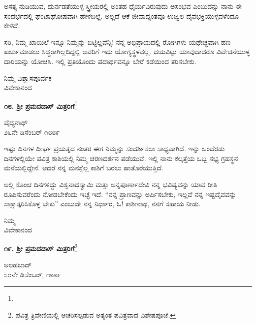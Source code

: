 ಅಸತ್ಯ ನುಡಿಯುವ, ದುರ್ನಡತೆಯುಳ್ಳ ಸ್ತ್ರೀಯರಲ್ಲಿ ಅಂತಹ ಧೈರ್ಯವಿರುವುದು ಅಸಂಭವ ಎಂಬುದನ್ನು ನಾನು ಈ ಸಂದರ್ಭದಲ್ಲಿ ಘಂಟಾಘೋಷವಾಗಿ ಹೇಳಬಲ್ಲೆ. ಅಲ್ಲದೆ ಆಕೆ ಜೀವಾದ್ಯಂತವೂ ಉಜ್ವಲ ದೈವಭಕ್ತಿಯುಳ್ಳವಳೆಂದೂ ಕೇಳಿದೆ.

ಸರಿ, ನಿಮ್ಮ ಖಾಯಿಲೆ ಇನ್ನೂ ನಿಮ್ಮನ್ನು ಬಿಟ್ಟಿಲ್ಲವೆನ್ನಿ! ನನ್ನ ಅಭಿಪ್ರಾಯದಲ್ಲಿ ರೋಗಿಗಳು ಯಥೇಚ್ಛವಾಗಿ ಹಣ ಖರ್ಚುಮಾಡಲು ಸಿದ್ಧರಾಗಿಲ್ಲದಿದ್ದಲ್ಲಿ ಅವರಿಗೆ ಇದು ಯೋಗ್ಯಸ್ಥಳವಲ್ಲ. ದಯವಿಟ್ಟು ಯಾವುದಾದರೂ ವಿವೇಚನೆಯುಳ್ಳ ದಾರಿಯನ್ನು ಯೋಚಿಸಿ. ಇಲ್ಲಿ ಪ್ರತಿಯೊಂದು ಪದಾರ್ಥವನ್ನೂ ಬೇರೆ ಕಡೆಯಿಂದ ತರಿಸಬೇಕು.

\vspace{-0.3cm}

{\flushright
ನಿಮ್ಮ ವಿಶ್ವಾಸಪೂರ್ವಕ\\ವಿವೇಕಾನಂದ\par}

\begin{center}
\textbf{೧೮. ಶ‍್ರೀ ಪ್ರಮದದಾಸ್ ಮಿತ್ರರಿಗೆ}\footnote{}
\end{center}

\begin{flushright}
ವೈದ್ಯನಾಥ್\\೨೬ನೇ ಡಿಸೆಂಬರ್ ೧೮೮೯
\end{flushright}

ಇಷ್ಟು ದಿನಗಳ ದೀರ್ಘ ಪ್ರಯತ್ನದ ನಂತರ ಈಗ ನಿಮ್ಮನ್ನು ಸಂದರ್ಶಿಸಲು ಸಾಧ್ಯವಾಗಿದೆ. ಇನ್ನು ಒಂದೆರಡು ದಿನಗಳಲ್ಲಿಯೇ ಪವಿತ್ರ ಕಾಶಿಯಲ್ಲಿ ನಿಮ್ಮ ಚರಣದರ್ಶನ ಪಡೆಯುವೆ. ಇಲ್ಲಿ ನಾನು ಕಲ್ಕತ್ತೆಯ ಒಬ್ಬ ಸಭ್ಯ ಗ್ರಹಸ್ಥನ ಮನೆಯಲ್ಲಿದ್ದೇನೆ. ಆದರೆ ನನ್ನ ಮನಸ್ಸೆಲ್ಲ ಕಾಶಿಗೆ ಬರಲು ಹಾತೊರೆಯುತ್ತಿದೆ.

ಅಲ್ಲಿ ಕೊಂಚ ದಿನಗಳಿದ್ದು ವಿಶ್ವನಾಥಸ್ವಾಮಿ ಮತ್ತು ಅನ್ನಪೂರ್ಣಾದೇವಿ ನನ್ನ ಭವಿಷ್ಯವನ್ನು ಯಾವ ರೀತಿ ರೂಪಿಸುವರೆಂದು ನೋಡಬೇಕೆಂದು ಇಚ್ಛೆ ಇದೆ. “ನನ್ನ ಪ್ರಾಣವನ್ನು ಅರ್ಪಿಸಬೇಕು, ಇಲ್ಲವೆ ನನ್ನ ಇಷ್ಟದೈವವನ್ನು ಸಾಕ್ಷಾತ್ಕರಿಸಿಕೊಳ್ಳ ಬೇಕು” ಎಂಬುದೇ ನನ್ನ ನಿರ್ಧಾರ, ಓ! ಕಾಶೀನಾಥ, ನನಗೆ ಸಹಾಯ ನೀಡು.

{\flushright
ನಿಮ್ಮ\\ವಿವೇಕಾನಂದ\par}
\vspace{-0.2cm}

\begin{center}
\textbf{೧೯. ಶ‍್ರೀ ಪ್ರಮದದಾಸ್ ಮಿತ್ರರಿಗೆ}\footnote{ಪವಿತ್ರ ತ್ರಿವೇಣಿಯಲ್ಲಿ ಆಚರಿಸಲ್ಪಡುವ ಅತ್ಯಂತ ಪವಿತ್ರವಾದ ವಿಶೇಷಪೂಜೆ.}
\end{center}
\vspace{-0.4cm}

\begin{flushright}
ಅಲಹಬಾದ್\\೩೦ನೇ ಡಿಸೆಂಬರ್, ೧೮೮೯
\end{flushright}
\vspace{-0.3cm}


